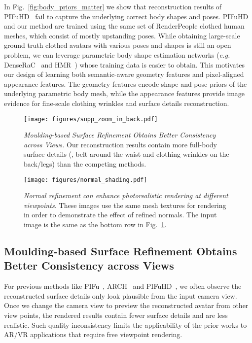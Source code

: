 \documentclass[10pt,twocolumn,letterpaper]{article}
\newcommand{\beforefigcaption}{\vspace{-5mm}}
\newcommand{\afterfigcaption}{\vspace{-5mm}}
\begin{document}
In Fig.~\ref{fig:body_priors_matter} we show that reconstruction results of PIFuHD~\cite{saito2020pifuhd} fail to capture the underlying correct body shapes and poses. PIFuHD and our method are trained using the same set of RenderPeople clothed human meshes, which consist of mostly upstanding poses. While obtaining large-scale ground truth clothed avatars with various poses and shapes is still an open problem, we can leverage parametric body shape estimation networks (\textit{e.g.} DenseRaC~\cite{DenseRaCICCV19} and HMR~\cite{kanazawa2018hmr}) whose training data is easier to obtain. This motivates our design of learning both semantic-aware geometry features and pixel-aligned appearance features. The geometry features encode shape and pose priors of the underlying parametric body mesh, while the appearance features provide image evidence for fine-scale clothing wrinkles and surface details reconstruction.

\begin{figure}[ptb]
\centering
\texttt{[image: figures/supp\_zoom\_in\_back.pdf]}
\beforefigcaption
\vspace{+3pt}
\caption{\textit{Moulding-based Surface Refinement Obtains Better Consistency across Views.} Our reconstruction results contain more full-body surface details (\eg, belt around the waist and clothing wrinkles on the back/legs) than the competing methods.
}
\afterfigcaption
\label{fig:supp_zoom_in_back}
\vspace{+5 pt}
\end{figure}

\begin{figure}[ptb]
\centering
\texttt{[image: figures/normal\_shading.pdf]}
\beforefigcaption
\vspace{+3pt}
\caption{\textit{Normal refinement can enhance photorealistic rendering at different viewpoints.} These images use the same mesh textures for rendering in order to demonstrate the effect of refined normals. The input image is the same as the bottom row in Fig.~\ref{fig:supp_zoom_in_back}. 
}
\afterfigcaption
\label{fig:normal_shading}
\end{figure}

\subsection{Moulding-based Surface Refinement Obtains Better Consistency across Views}

For previous methods like PIFu~\cite{PIFuICCV19}, ARCH~\cite{huang2020arch} and PIFuHD~\cite{saito2020pifuhd}, we often observe the reconstructed surface details only look plausible from the input camera view. Once we change the camera view to preview the reconstructed avatar from other view points, the rendered results contain fewer surface details and are less realistic. Such quality inconsistency limits the applicability of the prior works to AR/VR applications that require free viewpoint rendering.
\end{document}
